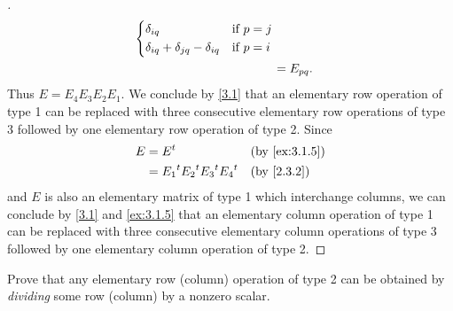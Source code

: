 \begin{proof}[]
\begin{align*}
\begin{dcases}
           \delta_{i q}                               & \text{if } p = j                       \\
           \delta_{i q} + \delta_{j q} - \delta_{i q} & \text{if } p = i
         \end{dcases}                                                           \\
     & = E_{p q}.
  \end{align*}
  Thus \(E = E_4 E_3 E_2 E_1\).
  We conclude by \cref{3.1} that an elementary row operation of type 1 can be replaced with three consecutive elementary row operations of type 3 followed by one elementary row operation of type 2.
  Since
  \begin{align*}
    E & = \tp{E}                              &  & \by{ex:3.1.5} \\
      & = \tp{E_1} \tp{E_2} \tp{E_3} \tp{E_4} &  & \by{2.3.2}
  \end{align*}
  and \(E\) is also an elementary matrix of type 1 which interchange columns, we can conclude by \cref{3.1} and \cref{ex:3.1.5} that an elementary column operation of type 1 can be replaced with three consecutive elementary column operations of type 3 followed by one elementary column operation of type 2.
\end{proof}

\begin{ex}\label{ex:3.1.10}
  Prove that any elementary row (column) operation of type 2 can be obtained by \emph{dividing} some row (column) by a nonzero scalar.
\end{ex}

